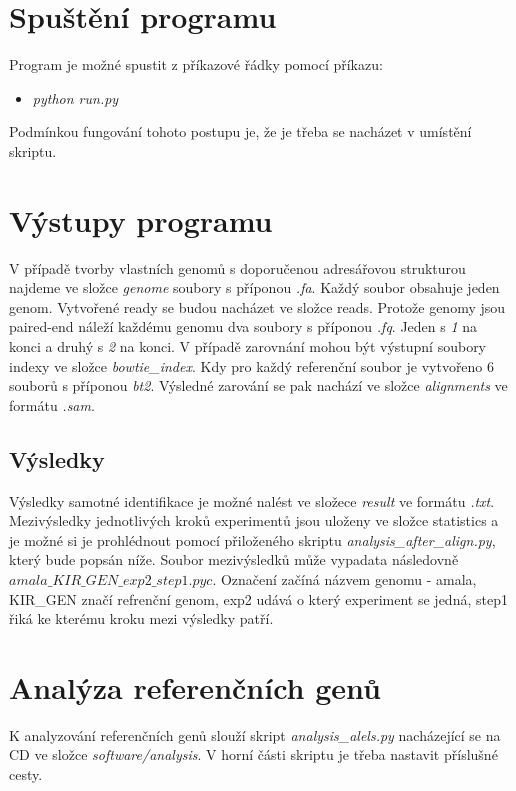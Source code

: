 \documentclass[czech,DP]{thesiskiv}
\numberwithin{equation}{section}
\begin{document}
\section{Spuštění programu}
Program je možné spustit z příkazové řádky pomocí příkazu: 

\begin{itemize}
 \item \colorbox{gray!15}{\textit{python run.py}}
\end{itemize}

\noindent
Podmínkou fungování tohoto postupu je, že je třeba se nacházet v umístění skriptu. 

\section{Výstupy programu}
V případě tvorby vlastních genomů s doporučenou adresářovou strukturou najdeme ve složce \textit{genome} soubory s příponou \textit{.fa}. Každý soubor obsahuje jeden genom.
Vytvořené ready se budou nacházet ve složce reads. Protože genomy jsou paired-end náleží každému genomu dva soubory s příponou \textit{.fq}. Jeden s \textit{1} na konci a druhý s \textit{2} na konci. 
V případě zarovnání mohou být výstupní soubory indexy ve složce \textit{bowtie\_index}. Kdy pro každý referenční soubor je vytvořeno 6 souborů s příponou \textit{bt2}. Výsledné zarování se pak nachází ve složce \textit{alignments} ve formátu \textit{.sam}. 

\subsection{Výsledky}
Výsledky samotné identifikace je možné nalést ve složece \textit{result} ve formátu \textit{.txt}. Mezivýsledky jednotlivých kroků experimentů jsou uloženy ve složce statistics a je možné si je prohlédnout pomocí přiloženého skriptu \textit{analysis\_after\_align.py}, který bude popsán níže. Soubor mezivýsledků může vypadata následovně $amala\_KIR\_GEN\_exp2\_step1.pyc$.  Označení začíná názvem genomu - amala, KIR\_GEN značí refrenční genom, exp2 udává o který experiment se jedná, step1 řiká ke kterému kroku mezi výsledky patří. 



\section{Analýza referenčních genů}
K analyzování referenčních genů slouží skript \textit{analysis\_alels.py} nacházející se na CD ve složce \textit{software/analysis}. V horní části skriptu je třeba nastavit příslušné cesty.
\end{document}
